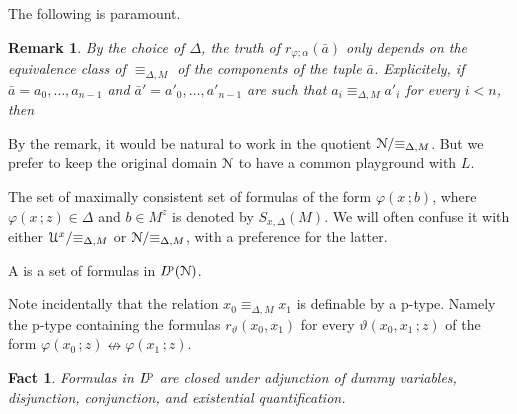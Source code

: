 \documentclass{amsproc}
\def\U{\EuScript U}
\def\N{\EuScript N}
\def\phi{\varphi}
\def\theta{\vartheta}
\newcounter{thm}
\theoremstyle{mio}
\newtheorem{fact}[thm]{Fact}\tcolorboxenvironment{fact}{mythm}
\newtheorem{remark}[thm]{Remark}\tcolorboxenvironment{remark}{mythm}
\renewcommand*{\emph}[1]{%
   \smash{\tikz[baseline]\node[rectangle, fill=teal!25, rounded corners, inner xsep=0.5ex, inner ysep=0.2ex, anchor=base, minimum height = 2.7ex]{\strut #1};}}
\begin{document}
The following is paramount.

\begin{remark}\label{rem_first}
  By the choice of $\Delta$, the truth of $r_{\phi;\alpha}(\bar a)$ only depends on the equivalence class of $\equiv_{\Delta,M}$ of the \textit{components\/} of the tuple $\bar a$.
  Explicitely, if $\bar a=a_0,\dots,a_{n-1}$ and $\bar a'=a'_0,\dots,a'_{n-1}$ are such that $a_i\equiv_{\Delta,M} a'_i$ for every $i<n$, then \smallskip
  
  \ceq{\#\hfill r_{\phi;\alpha}(\bar a)}{\leftrightarrow}{r_{\phi;\alpha}(\bar a').} \smallskip

\end{remark}

By the remark, it would be natural to work in the quotient $\N/{\equiv_{\Delta,M}}$.
But we prefer to keep the original domain $\N$ to have a common playground with $L$.

The set of maximally consistent set of formulas of the form $\phi(x\,;b)$, where $\phi(x\,;z)\in\Delta$ and $b\in M^z$ is denoted by  $S_{x,\Delta}(M)$.
We will often confuse it with either $\U^x/{\equiv_{\Delta,M}}$ or $\N/{\equiv_{\Delta,M}}$, with a preference for the latter.

A \emph{p-type\/} is a set of formulas in $L^{\rm\! p}(\N)$. 


Note incidentally that the relation $x_0\equiv_{\Delta,M} x_1$ is definable by a p-type.
Namely the p-type containing the formulas $r_{\theta}(x_0,x_1)$ for every $\theta(x_0,x_1\,;z)$ of the form $\phi(x_0\,;z)\nleftrightarrow\phi(x_1\,;z)$.

\begin{fact}\label{fact_p_qe}
  Formulas in $L^{\rm\! p}$ are closed under adjunction of dummy variables, disjunction, conjunction, and existential quantification.
\end{fact}
\end{document}
